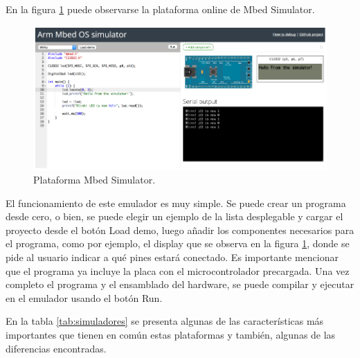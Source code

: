 En la figura \ref{fig:ArmMbed} puede observarse la plataforma online de Mbed Simulator.


\begin{figure}[ht]
	\centering
	\includegraphics[scale=.44]{./Figures/ArmMbed.png}
	\caption{Plataforma Mbed Simulator.}
	\label{fig:ArmMbed}
\end{figure}

El funcionamiento de este emulador es muy simple. Se puede crear un programa desde cero, o bien, se puede elegir un ejemplo de la lista desplegable y cargar el proyecto desde el botón \textquotedbl Load demo\textquotedbl, luego añadir los componentes necesarios para el programa, como por ejemplo, el display que se observa en la figura \ref{fig:ArmMbed}, donde se pide al usuario indicar a qué pines estará conectado. Es importante mencionar que el programa ya incluye la placa con el microcontrolador precargada. Una vez completo el programa y el ensamblado del hardware, se puede compilar y ejecutar en el emulador usando el botón \textquotedbl Run\textquotedbl.

En la tabla \ref{tab:simuladores} se presenta algunas de las características más importantes que tienen en común estas plataformas y también, algunas de las diferencias encontradas.

